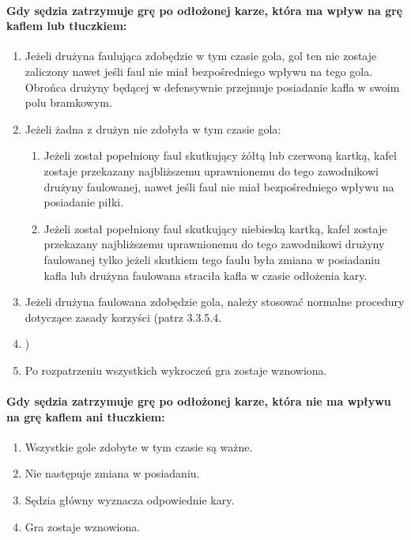 \documentclass[12pt]{article}
\begin{document}
\paragraph{Gdy sędzia zatrzymuje grę po odłożonej karze, która ma
wpływ na grę kaflem lub tłuczkiem:}

\begin{enumerate}
\item
    Jeżeli drużyna faulująca zdobędzie w tym czasie gola, gol ten nie
  zostaje zaliczony nawet jeśli faul nie miał bezpośredniego wpływu na
  tego gola. Obrońca drużyny będącej w defensywnie przejmuje posiadanie
  kafla w swoim polu bramkowym.
  \item
    Jeżeli żadna z drużyn nie zdobyła w tym czasie gola:
  
  \begin{enumerate}
  \item
        Jeżeli został popełniony faul skutkujący żółtą lub czerwoną kartką,
    kafel zostaje przekazany najbliższemu uprawnionemu do tego
    zawodnikowi drużyny faulowanej, nawet jeśli faul nie miał
    bezpośredniego wpływu na posiadanie piłki.
      \item
        Jeżeli został popełniony faul skutkujący niebieską kartką, kafel
    zostaje przekazany najbliższemu uprawnionemu do tego zawodnikowi
    drużyny faulowanej tylko jeżeli skutkiem tego faulu była zmiana w
    posiadaniu kafla lub drużyna faulowana straciła kafla w czasie
    odłożenia kary.
      \end{enumerate}
\item
    Jeżeli drużyna faulowana zdobędzie gola, należy stosować normalne
  procedury dotyczące zasady korzyści (patrz 3.3.5.4.\item)
  \item
    Po rozpatrzeniu wszystkich wykroczeń gra zostaje wznowiona.
  \end{enumerate}

\paragraph{Gdy sędzia zatrzymuje grę po odłożonej karze, która nie
ma wpływu na grę kaflem ani tłuczkiem:}

\begin{enumerate}
\item
    Wszystkie gole zdobyte w tym czasie są ważne.
  \item
    Nie następuje zmiana w posiadaniu.
  \item
    Sędzia główny wyznacza odpowiednie kary.
  \item
    Gra zostaje wznowiona.
  \end{enumerate}
\end{document}
